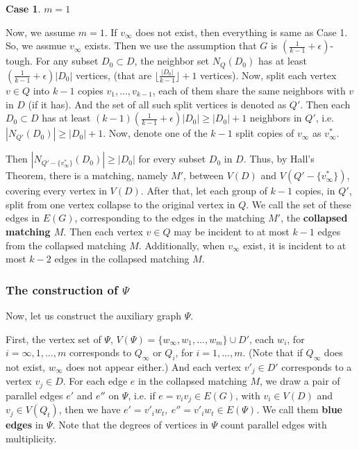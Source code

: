 \documentclass{amsart}
\newtheorem{case}{Case}
\begin{document}
\begin{case}$m=1$\end{case}
Now, we assume $m=1$. If $v_{\infty}$ does not exist, then everything is same as Case 1.
So, we assmue $v_{\infty}$ exists. Then we use the assumption that $G$ is $(\frac{1}{k-1}+\epsilon)$-tough. For any subset $D_0\subset D$, the neighbor set $N_Q(D_0)$ has at least $(\frac{1}{k-1}+\epsilon)|D_0|$ vertices, (that are $\lfloor\frac{|D_0|}{k-1}\rfloor+1$ vertices).
Now, split each vertex $v\in Q$ into $k-1$ copies $v_1,\ldots,v_{k-1}$, each of them share the same neighbors with $v$ in $D$ (if it has). And the set of all such split vertices is denoted as $Q'$. Then each $D_0\subset D$ has at least $(k-1)(\frac{1}{k-1}+\epsilon)|D_0|\ge|D_0|+1$ neighbors in $Q'$, i.e. $|N_{Q'}(D_0)|\ge|D_0|+1$. Now, denote one of the $k-1$ split copies of $v_{\infty}$ as $v^*_{\infty}$.

Then $|N_{Q'-\{v^*_{\infty}\}}(D_0)|\ge|D_0|$ for every subset $D_0$ in $D$. Thus, by Hall's Theorem, there is a matching, namely $M'$, between $V(D)$ and $V(Q'-\{v^*_{\infty}\})$, covering every vertex in $V(D)$. 
After that, let each group of $k-1$ copies, in $Q'$, split from one vertex collapse to the original vertex in $Q$. We call the set of these edges in $E(G)$, corresponding to the edges in the matching $M'$, the {\bf collapsed matching $M$}. Then each vertex $v\in Q$ may be incident to at most $k-1$ edges from the collapsed matching $M$.
Additionally, when $v_{\infty}$ exist, it is incident to at most $k-2$ edges in the collapsed matching $M$.









\subsubsection{The construction of $\Psi$}
Now, let us construct the auxiliary graph $\Psi$.

First, the vertex set of $\Psi$, $V(\Psi)=\{w_{\infty},w_1,\ldots,w_m\}\cup D'$, each $w_i$, for 
$i=\infty,1,\ldots,m$ corresponds to $Q_{\infty}$ or $Q_i$, for $i=1,\ldots,m$. (Note that if $Q_{\infty}$ does not exist, $w_{\infty}$ does not appear either.) And each vertex $v'_j\in D'$ corresponds to a vertex $v_j\in D$. For each edge $e$ in the collapsed matching $M$, we draw a pair of parallel edges $e'$ and $e''$ on $\Psi$, i.e. if $e=v_iv_j\in E(G)$, with $v_i\in V(D)$ and $v_j\in V(Q_t)$, then we have $e'=v'_iw_t,~e''=v'_iw_t\in E(\Psi)$. We call them {\bf blue edges} in $\Psi$. Note that the degrees of vertices in $\Psi$ count parallel edges with multiplicity.
\end{document}
